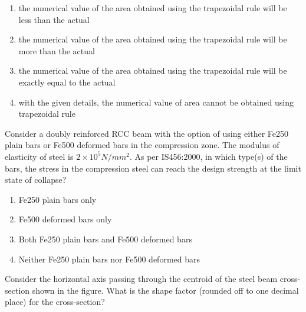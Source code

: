 \begin{enumerate}
\item the numerical value of the area obtained using the trapezoidal rule will be less than the actual
\item the numerical value of the area obtained using the trapezoidal rule will be more than the actual
\item the numerical value of the area obtained using the trapezoidal rule will be exactly equal to the actual
\item with the given details, the numerical value of area cannot be obtained using trapezoidal rule
\end{enumerate}
\item Consider a doubly reinforced RCC beam with the option of using either Fe250 plain bars or Fe500 deformed bars in the compression zone. The modulus of elasticity of steel is $2 \times 10^5 N/mm^2$. As per IS456:2000, in which type(s) of the bars, the stress in the compression steel can reach the design strength  at the limit
state of collapse?
\begin{enumerate}
\item Fe250 plain bars only
\item Fe500 deformed bars only
\item Both Fe250 plain bars and Fe500 deformed bars
\item Neither Fe250 plain bars nor Fe500 deformed bars
\end{enumerate}
\item Consider the horizontal axis passing through the centroid of the steel beam cross-section shown in the figure. What is the shape factor (rounded off to one decimal place) for the cross-section?

